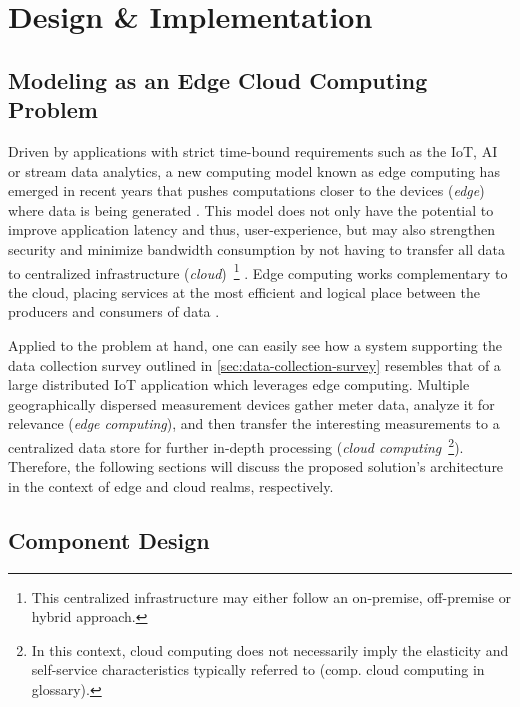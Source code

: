 
\chapter{Design \& Implementation}
\label{chp:architecture}

\section{Modeling as an Edge Cloud Computing Problem}
\label{sec:modeling-as-edge-cloud-problem}

Driven by applications with strict time-bound requirements such as the \ac{IoT}, \ac{AI} or stream data analytics, a new computing model known as edge computing has emerged in recent years that pushes computations closer to the devices (\textit{edge}) where data is being generated \cite[p.~373]{xiong2018extend} \cite[p.~118]{alam2018orchestration}. This model does not only have the potential to improve application latency and thus, user-experience, but may also strengthen security and minimize bandwidth consumption by not having to transfer all data to centralized infrastructure (\textit{cloud})~\footnote{This centralized infrastructure may either follow an on-premise, off-premise or hybrid approach.} \cite[p.~295]{hoque2017towards}. Edge computing works complementary to the cloud, placing services at the most efficient and logical place between the producers and consumers of data \cite[p.~122]{alam2018orchestration}.

Applied to the problem at hand, one can easily see how a system supporting the data collection survey outlined in \autoref{sec:data-collection-survey} resembles that of a large distributed \ac{IoT} application which leverages edge computing. Multiple geographically dispersed measurement devices gather meter data, analyze it for relevance (\textit{edge computing}), and then transfer the interesting measurements to a centralized data store for further in-depth processing (\textit{cloud computing}~\footnote{In this context, cloud computing does not necessarily imply the elasticity and self-service characteristics typically referred to (comp. \gls{cloud computing} in glossary).}). Therefore, the following sections will discuss the proposed solution's architecture in the context of edge and cloud realms, respectively.


\section{Component Design}
\label{sec:component-design}


